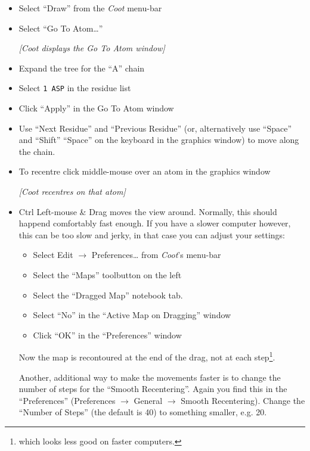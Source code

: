 \documentclass{article}
\begin{document}
\begin{itemize}
\item Select \textsf{``Draw''} from the \emph{Coot} menu-bar
\item Select \textsf{``Go To Atom\ldots''}

\textsl{  [\emph{Coot} displays the Go To Atom window]}

\item Expand the tree for the ``A'' chain
\item Select \texttt{1 ASP} in the residue list
\item Click \textsf{``Apply''} in the Go To Atom window
  
\item Use \textsf{``Next Residue''} and
  \textsf{``Previous Residue''} (or, alternatively use ``Space'' and ``Shift''
  ``Space'' on the keyboard in the graphics window) to move along the chain.

\item To recentre click middle-mouse over an atom in the graphics window

\textsl{[\emph{Coot} recentres on that atom]}

\item Ctrl Left-mouse \& Drag moves the view around.  Normally, this should
  happend comfortably fast enough. If you have a slower computer however, this
  can be too slow and jerky, in that case you can adjust your settings:
  \begin{itemize}
  \item Select \textsf{Edit $\rightarrow$ Preferences\ldots} from \emph{Coot}'s menu-bar
  \item Select the \textsf{``Maps''} toolbutton on the left
  \item Select the \textsf{``Dragged Map''} notebook tab.
  \item Select \textsf{``No''} in the ``Active Map on Dragging'' window
  \item Click \textsf{``OK''} in the ``Preferences'' window
  \end{itemize}
  Now the map is recontoured at the end of the drag, not at each
  step\footnote{which looks less good on faster computers.}.

  Another, additional way to make the movements faster is to change the 
  number of steps for the ``Smooth Recentering''. Again you find this in
  the ``Preferences'' (\textsf{Preferences $\rightarrow$ General $\rightarrow$ 
  Smooth Recentering}). Change the \textsf{``Number of Steps''} (the 
  default is 40) to something smaller, e.g. 20.



\end{itemize}
\end{document}

